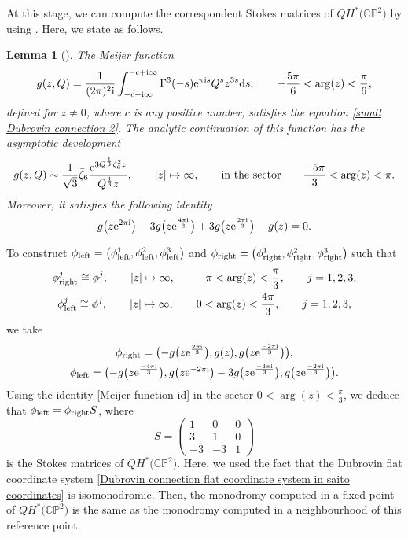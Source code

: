 \documentclass[11pt]{article}
\numberwithin{equation}{section}
\numberwithin{equation}{section}
\newtheorem{Lemma}[Theorem]{Lemma}
\begin{document}
At this stage, we can compute the correspondent Stokes matrices of $QH^{*}\bigl(\mathbb{CP}^2\bigr)$ by using \cite[Lemma~4.9]{B.Dubrovin3}. Here, we state as follows.

\begin{Lemma}[{\cite{B.Dubrovin3}}]
The Meijer function
\[%
g(z,Q)=\frac{1}{(2\pi)^2{\rm i}}\int_{-c-{\rm i}\infty}^{-c+{\rm i}\infty} \Gamma^3(-s){\rm e}^{\pi {\rm i}s }Q^sz^{3s}{\rm d}s, \qquad -\frac{5\pi}{6}<\arg(z)<\frac{\pi}{6},
\]
defined for $z\neq 0$, where $c$ is any positive number, satisfies the equation \eqref{small Dubrovin connection 2}. The analytic continuation of this function has the asymptotic development
\[
g(z,Q)\sim \frac{1}{\sqrt{3}}\bar\zeta_6\frac{{\rm e}^{3Q^{\frac{1}{3}}\bar\zeta_6^2z}}{Q^{\frac{1}{3}}z}, \qquad |z|\mapsto \infty, \qquad \text{in the sector} \qquad \frac{-5\pi}{3}<\arg(z)<\pi.
\]
Moreover, it satisfies the following identity
\begin{gather}\label{Meijer function id}
g\bigl(z{\rm e}^{2\pi {\rm i}}\bigr)-3g\bigl(z{\rm e}^{\frac{4\pi {\rm i}}{3}}\bigr)+3g\bigl(z{\rm e}^{\frac{2\pi {\rm i}}{3}}\bigr)-g(z)=0.
\end{gather}

\end{Lemma}


To construct $\phi_{\rm left}=\bigl(\phi_{\rm left}^1,\phi_{\rm left}^2,\phi_{\rm left}^3\bigr)$ and $\phi_{\rm right}=\bigl(\phi_{\rm right}^1,\phi_{\rm right}^2,\phi_{\rm right}^3\bigr)$ such that
\begin{gather*}
\phi_{\rm right}^j\cong\phi^j, \qquad |z|\mapsto \infty, \qquad -\pi<\arg(z)<\frac{\pi}{3}, \qquad j=1,2,3,\\
\phi_{\rm left}^j\cong\phi^j, \qquad |z|\mapsto \infty, \qquad 0<\arg(z)<\frac{4\pi}{3}, \qquad j=1,2,3,
\end{gather*}
we take
\begin{gather*}
\phi_{\rm right}=\bigl(-g\bigl(z{\rm e}^{\frac{2\pi {\rm i}}{3}}\bigr),g(z),g\bigl(z{\rm e}^{\frac{-2\pi {\rm i}}{3}}\bigr) \bigr),\\
\phi_{\rm left}=\bigl(-g\bigl(z{\rm e}^{\frac{-4\pi {\rm i}}{3}}\bigr),g\bigl(z{\rm e}^{-2\pi {\rm i}}\bigr)-3g\bigl(z{\rm e}^{\frac{-4\pi {\rm i}}{3}}\bigr),g\bigl(z{\rm e}^{\frac{-2\pi {\rm i}}{3}}\bigr) \bigr).
\end{gather*}
Using the identity \eqref{Meijer function id} in the sector $0<\arg(z)<\frac{\pi}{3}$, we deduce that
$\phi_{\rm left}=\phi_{\rm right}S$,
where
\[
S={\begin{pmatrix}
1& 0&0 \\
3& 1& 0\\
-3& -3 & 1
\end{pmatrix}}
\]
is the Stokes matrices of $QH^{*}\bigl(\mathbb{CP}^2\bigr)$. Here, we used the fact that the Dubrovin flat coordinate system \eqref{Dubrovin connection flat coordinate system in saito coordinates} is isomonodromic. Then, the monodromy computed in a fixed point of $QH^{*}\bigl(\mathbb{CP}^2\bigr)$ is the same as the monodromy computed in a neighbourhood of this reference point.
\end{document}
